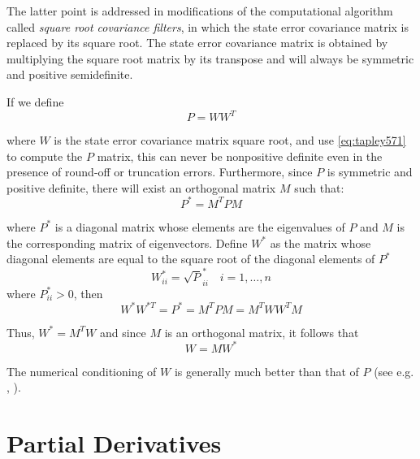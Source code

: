 The latter point is addressed in modifications of the computational algorithm called
\emph{square root covariance filters}, in which the state error covariance matrix is
replaced by its square root. The state error covariance matrix is obtained by
multiplying the square root matrix by its transpose and will always be symmetric
and positive semidefinite.

If we define
\begin{equation}
	\label{eq:tapley571}
	P = W W^T
\end{equation}

where \(W\) is the state error covariance matrix square root, and use \ref{eq:tapley571} to
compute the \(P\) matrix, this can never be nonpositive definite even in the presence
of round-off or truncation errors. Furthermore, since \(P\) is symmetric and positive
definite, there will exist an orthogonal matrix \(M\) such that:
\begin{equation}
	\label{eq:tapley572}
	P^* = M^T P M
\end{equation}

where \(P^*\) is a diagonal matrix whose elements are the eigenvalues of \(P\) and
\(M\) is the corresponding matrix of eigenvectors. Define \(W^*\) as the matrix
whose diagonal elements are equal to the square root of the diagonal elements of \(P^*\)
\begin{equation}
	W^*_{ii} = \sqrt P^*_{ii} \quad i=1,\ldots ,n
\end{equation}
where \(P^*_{ii} > 0\), then
\begin{equation}
	W^* W^{*T} = P^* = M^T P M = M^T W W^T M
\end{equation}

Thus, \(W^* = M^T W \) and since \(M\) is an orthogonal matrix, it follows that
\begin{equation}
	\label{eq:tapley574}
	W = M W^*
\end{equation}

The numerical conditioning of \(W\) is generally much better than that of \(P\) (see
e.g. \cite{lawson1995}, \cite{tapley}).

\section{Partial Derivatives}

